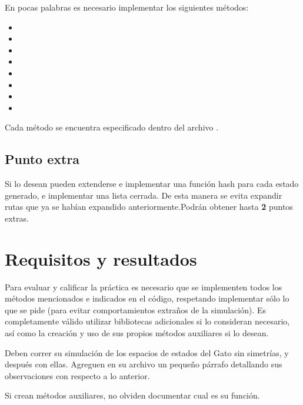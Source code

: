 \noindent En pocas palabras es necesario implementar los siguientes métodos:

\begin{itemize}
  \item {}
  \item {}
  \item {}
  \item {}
  \item {}
  \item {}
  \item {}
  \item {}
\end{itemize}

\noindent Cada método se encuentra especificado dentro del archivo .


\subsection{Punto extra}
Si lo desean pueden extenderse e implementar una función hash para cada estado generado, e implementar una lista cerrada. De esta manera se evita expandir rutas que ya se habían expandido anteriormente.Podrán obtener hasta \textbf{2} puntos extras.


\section{Requisitos y resultados}

Para evaluar y calificar la práctica es necesario que se implementen todos los métodos mencionados e indicados en el código, respetando implementar sólo lo que se pide (para evitar comportamientos extraños de la simulación).
Es completamente válido utilizar bibliotecas adicionales si lo consideran necesario, así como la creación y uso de sus propios métodos auxiliares si lo desean.

Deben correr su simulación de los espacios de estados del Gato sin simetrías, y después con ellas. Agreguen en su archivo  un pequeño párrafo detallando sus observaciones con respecto a lo anterior.

Si crean métodos auxiliares, no olviden documentar cual es su función.

